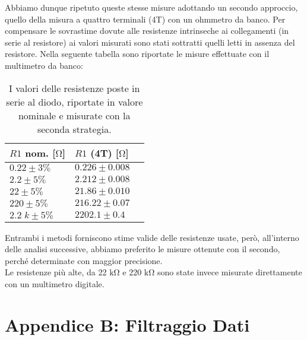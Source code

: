 \documentclass{article}[a4paper, oneside, 11pt]
\begin{document}
Abbiamo dunque ripetuto queste stesse misure adottando un secondo approccio,
quello della misura a quattro terminali (4T) con un ohmmetro da banco.
Per compensare le sovrastime dovute alle resistenze intrinseche ai
collegamenti (in serie al resistore) ai valori misurati sono stati sottratti
quelli letti in assenza del resistore.
Nella seguente tabella sono riportate le misure effettuate con il multimetro
da banco:

\begin{table}[H]
	\begin{center}
		\begin{tabular}{lll}
		\toprule
		$R1$ nom. [$\si{\ohm}$] & $R1$ (4T) [$\si{\ohm}$] \\
		\midrule
		\midrule
		$0.22 \pm 3 \% $     & $0.226 \pm 0.008$ \\
		$2.2 \pm 5 \% $     & $2.212 \pm 0.008$ \\
		$22 \pm 5 \% $     & $21.86 \pm 0.010$ \\
		$220 \pm 5 \% $     & $216.22 \pm 0.07$ \\
		$2.2\; \si{k} \pm 5 \% $ & $2202.1 \pm 0.4$ \\
		\bottomrule
    	\end{tabular}
    \caption{I valori delle resistenze poste in serie al diodo, riportate in
       		 valore nominale e misurate con la seconda strategia. \label{tab:res}}
	\end{center}
\end{table}

Entrambi i metodi forniscono stime valide delle resistenze usate, però,
all'interno delle analisi successive, abbiamo preferito le misure ottenute
con il secondo, perché determinate con maggior precisione.\\
Le resistenze più alte, da 22 $\si{\kohm}$ e 220 $\si{\kohm}$ sono state
invece misurate direttamente con un multimetro digitale.

\section{Appendice B: Filtraggio Dati}\label{app: B}
\end{document}
